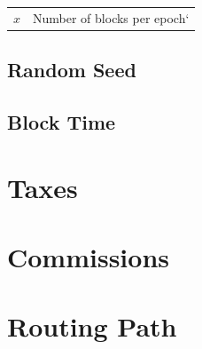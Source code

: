 \documentclass[a4paper,10pt]{article}
\makeatletter
\newenvironment{conditions}
  {\par\vspace{\abovedisplayskip}\noindent\begin{tabular}{>{$}l<{$} @{${}={}$} l}}
  {\end{tabular}\par\vspace{\belowdisplayskip}}
\makeatother
\begin{document}
\begin{conditions}
x & Number of blocks per epoch`
\end{conditions}

\subsection{Random Seed}






\subsection{Block Time}
\section{Taxes}
\section{Commissions}
\section{Routing Path}
\end{document}
